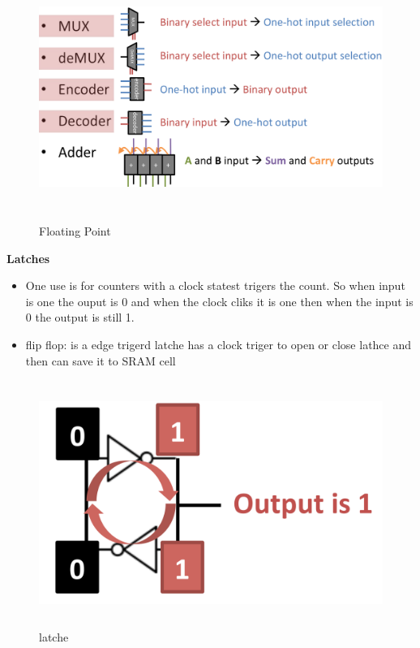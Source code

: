 \documentclass{article}
\begin{document}
\begin{figure}[h]
    \vspace{10mm}
    \centering
    \includegraphics[width=16cm, height=8cm]{image/important-logic-blocks.png} 
    \caption{Floating Point}
\end{figure}

\textbf{Latches}
\begin{itemize}
\item  One use is for counters with a clock statest trigers the count.
  So when input is one the ouput is 0 and when the clock cliks it is one then when the input is
  0 the output is still 1.
\item flip flop: is a edge trigerd latche has a clock triger to open or close lathce and then can save it to SRAM cell
\end{itemize}

\begin{figure}[h]
    \vspace{10mm}
    \centering
    \includegraphics[width=16cm, height=8cm]{image/latche.png} 
    \caption{latche}
\end{figure}
\end{document}
